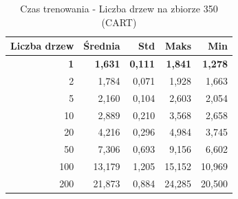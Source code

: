 \begin{table}[htbp]
\centering
\small
\setlength{\tabcolsep}{6pt}
\renewcommand{\arraystretch}{1.2}
\caption{Czas trenowania - Liczba drzew na zbiorze 350 (CART)}
\label{tab:CART_tree_count_350_time}
\begin{tabular}{r|r|r|r|r}
\toprule
Liczba drzew & Średnia & Std & Maks & Min \\
\hline
\textbf{1} & \textbf{1,631} & \textbf{0,111} & \textbf{1,841} & \textbf{1,278} \\
2 & 1,784 & 0,071 & 1,928 & 1,663 \\
5 & 2,160 & 0,104 & 2,603 & 2,054 \\
10 & 2,889 & 0,210 & 3,568 & 2,658 \\
20 & 4,216 & 0,296 & 4,984 & 3,745 \\
50 & 7,306 & 0,693 & 9,156 & 6,602 \\
100 & 13,179 & 1,205 & 15,152 & 10,969 \\
200 & 21,873 & 0,884 & 24,285 & 20,500 \\
\bottomrule
\end{tabular}
\end{table}